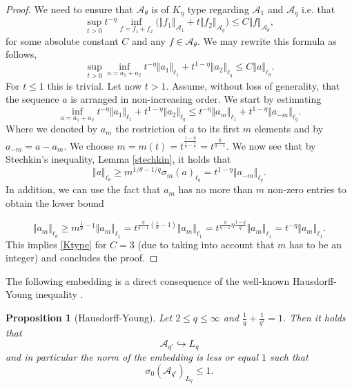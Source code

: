 \documentclass[11pt,reqno]{article}
\numberwithin{equation}{section}
\theoremstyle{definition}
\theoremstyle{plain}
\newtheorem{prop}[satz]{Proposition}
\newcommand{\ca}{\ensuremath{\mathcal A}}
\begin{document}
\begin{proof}
    We need to ensure that \(\ca_\theta\) is of \(K_\eta\) type regarding \(\ca_1\) and \(\ca_q\) i.e. that 
    \begin{equation} \label{Ktype}
        \sup_{t>0} t^{-\eta} \inf_{f = f_1 + f_2}\big( \Vert f_1 \Vert_{\ca_1} + t\Vert f_2\Vert_{\ca_q}\big) \leq C \Vert f \Vert_{\ca_\theta},
    \end{equation}
    for some absolute constant \(C\) and any \(f \in \ca_\theta\).
    We may rewrite this formula as follows,
       \begin{equation}
        \sup_{t>0} \inf_{a = a_1 + a_2} t^{-\eta} \Vert a_1 \Vert_{\ell_1} + t^{1-\eta} \Vert a_2\Vert_{\ell_q}\leq C \Vert a \Vert_{\ell_\theta}.
    \end{equation}
    For \(t \leq 1\) this is trivial. Let now \(t>1\). Assume, without loss of generality, that the sequence \(a\) is arranged in non-increasing order. We start by estimating
    \begin{equation}
        \inf_{a = a_1 + a_2} t^{-\eta} \Vert a_1 \Vert_{\ell_1} + t^{1-\eta} \Vert a_2\Vert_{\ell_q} \leq t^{-\eta} \Vert a_{m} \Vert_{\ell_1} + t^{1-\eta} \Vert a_{-m}\Vert_{\ell_q}.
    \end{equation}
    Where we denoted by \(a_m\) the restriction of \(a\) to its first \(m\) elements and by \(a_{-m} = a - a_m\). We choose \(m = m(t) = t^{\frac{1-\eta}{\frac{1}{\theta}-\frac{1}{q}}} = t^{\frac{q}{q-1}}\). 
    We now see that by Stechkin's inequality, Lemma \ref{stechkin}, it holds that
    \begin{equation}
        \Vert a \Vert_{\ell_\theta} \geq m^{1/\theta-1/q} \sigma_m(a)_{\ell_q} = t^{{1-\eta}}\Vert a_{-m} \Vert_{\ell_q}.
    \end{equation}
    In addition, we can use the fact that \(a_m\) has no more than \(m\) non-zero entries to obtain the lower bound
    
    \begin{equation}
            \Vert a_m \Vert_{\ell_\theta}  \geq m^{\frac{1}{\theta}-1} \Vert a_m \Vert_{\ell_1}  = t^{\frac{q}{q-1} (\frac{1}{\theta}-1)} \Vert a_m \Vert_{\ell_1} = t^{\frac{q}{q-1} \eta \frac{1-q}{q}} \Vert a_m \Vert_{\ell_1} =t^{-\eta} \Vert a_m \Vert_{\ell_1}.
 \end{equation}
 This implies \eqref{Ktype} for \(C = 3\) (due to taking into account that \(m\) has to be an integer) and concludes the proof.
\end{proof}

The following embedding is a direct consequence of the well-known Hausdorff-Young inequality \cite[Satz II]{Haus23}.
\begin{prop}[Hausdorff-Young]\label{Haus_young}
    Let  \(2 \leq q \leq \infty\) and \(\frac{1}{q} + \frac{1}{q'} = 1\). Then it holds that 
    \begin{equation}
        \ca_{q'} \hookrightarrow L_q 
    \end{equation}
    and in particular the norm of the embedding is less or equal \(1\) such that
    \begin{equation}
        \sigma_0(\ca_{q'})_{L_q} \leq 1.
    \end{equation}
\end{prop}
\end{document}
